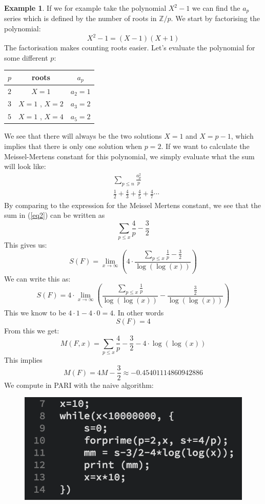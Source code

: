 \documentclass{article}
\theoremstyle{definition}
\newtheorem{example}{Example}[section]
\theoremstyle{remark}
\begin{document}
\begin{example}\label{example 4.1}
If we for example take the polynomial $X^2-1$ we can find the $a_p$ series which is defined by the number of roots in $\mathbb{Z}/p$.
We start by factorising the polynomial:
$$X^2-1=(X-1)(X+1)$$
The factorisation makes counting roots easier. Let's evaluate the polynomial for some different $p$:
\begin{table}[H]
\centering
\begin{tabular}{c|c|c}
	\hline $p$ & roots & $a_p$ \\
	\hline $2$ & $X=1$ & $a_2=1$ \\
    \hline $3$ & $X=1$ , $X=2$ & $a_3 = 2$ \\
    \hline $5$ & $X=1$ , $X=4$ & $a_5 = 2$
\end{tabular}
\end{table}
We see that there will always be the two solutions $X=1$ and $X=p-1$, which implies that there is only one solution when $p=2$. If we want to calculate the Meissel-Mertens constant for this polynomial, we simply evaluate what the sum will look like:
\begin{equation} \label{eq2}
\begin{split}
& \sum_{p\leq n} \frac{a_p^2}{p} \\
& \frac{1}{2}+\frac{4}{3}+\frac{4}{5}+\frac{4}{7}\cdots
\end{split}
\end{equation}
By comparing to the expression for the Meissel Mertens constant, we see that the sum in (\ref{eq2}) can be written as
$$ \sum_{p\leq x}\frac{4}{p} - \frac{3}{2}$$
This gives us:
$$S(F)=\lim_{x \rightarrow \infty}\left(4\cdot \frac{\sum_{p\leq x}\frac{1}{p}-\frac{3}{2}}{\log(\log(x))}\right)$$
We can write this as:
$$S(F)=4\cdot \lim_{x \rightarrow \infty}\left(\frac{\sum_{p\leq x}\frac{1}{p}}{\log(\log(x))}-\frac{\frac{3}{2}}{\log(\log(x))}\right)$$
This we know to be $4\cdot 1 - 4\cdot 0 = 4$. In other words
$$S(F)=4$$
From this we get:
$$M(F,x)= \sum_{p\leq x}\frac{4}{p} - \frac{3}{2}-4\cdot \log(\log(x))$$
This implies
$$M(F)=4M-\frac{3}{2}\approx -0.45401114860942886$$
We compute in PARI with the naive algorithm:
\begin{figure}[H]
\centering\includegraphics[width = 0.7 \textwidth]{Example4-1.png}

\end{figure}
\end{example}
\end{document}
